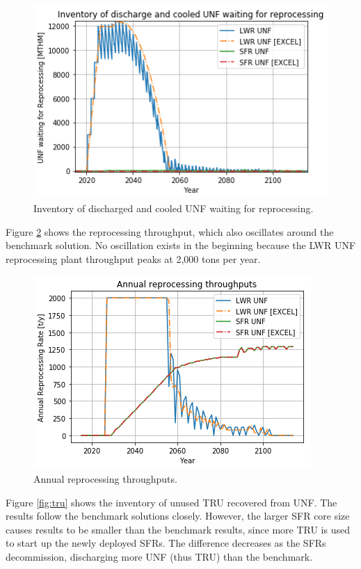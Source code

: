 \begin{figure}[htbp!]
    \begin{center}
        \includegraphics[scale=0.5]{./images/results_18/waiting_monthly.png}
    \end{center}
        \caption{Inventory of discharged and cooled \gls{UNF} waiting for reprocessing.}
    \label{fig:waiting_monthly}
\end{figure}


Figure \ref{fig:rep} shows the reprocessing throughput, which also oscillates around
the benchmark solution. No oscillation exists in the beginning because the
\gls{LWR} \gls{UNF} reprocessing plant throughput peaks at 2,000 tons per year.

\begin{figure}[htbp!]
    \begin{center}
        \includegraphics[scale=0.5]{./images/results_18/rep.png}
    \end{center}
        \caption{Annual reprocessing throughputs.}
    \label{fig:rep}
\end{figure}


Figure \ref{fig:tru} shows the inventory of unused \gls{TRU} recovered from \gls{UNF}.
The \Cyclus results follow the benchmark solutions closely. However,
the larger \gls{SFR} core size causes \Cyclus results to be smaller than the benchmark results,
since more \gls{TRU} is used to
start up the newly deployed \glspl{SFR}. The difference decreases as the
\glspl{SFR} decommission, discharging more \gls{UNF} (thus \gls{TRU}) than
the benchmark.

